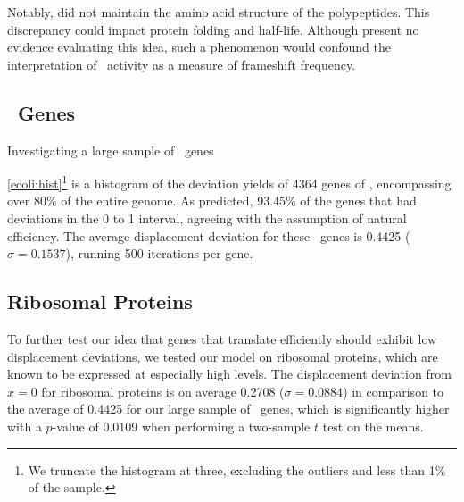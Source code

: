 \documentclass[12pt]{article}
\begin{document}
Notably, \citeauthor{weiss87} did not maintain the amino acid structure of the polypeptides.  
This discrepancy could impact protein folding and half-life.  Although \citeauthor{weiss87} 
present no evidence evaluating this idea, such a phenomenon would confound the interpretation 
of \bgals\ activity as a measure of frameshift frequency.

\subsection{\ecoli\ Genes}
\begin{cfigure}
  \caption{Investigating a large sample of \ecoli\ genes}
  \quad
\end{cfigure}

\autoref{ecoli:hist}\footnote{We truncate the histogram at three, excluding
  the outliers and less than 1\% of the sample.} is a histogram of the
deviation yields of 4364 genes of \ecoli, encompassing over 80\% of the entire
genome.  As predicted, 93.45\% of the genes that had deviations in the 0
to 1 interval, agreeing with the assumption of natural efficiency.  The
average displacement deviation for these \ecoli\ genes is 0.4425 ($\sigma = 0.1537$), 
running 500 iterations per gene.

\subsection{Ribosomal Proteins}
\label{section:riboproteins}
To further test our idea that genes that translate efficiently should exhibit
low displacement deviations, we tested our model on ribosomal proteins, which
are known to be expressed at especially high levels.
The displacement deviation from $x=0$ for ribosomal proteins
is on average 0.2708 ($\sigma = 0.0884$) in comparison to the average of 0.4425 for our
large sample of \ecoli\ genes, which is significantly higher with a $p$-value of
0.0109 when performing a two-sample $t$ test on the means.
\end{document}
